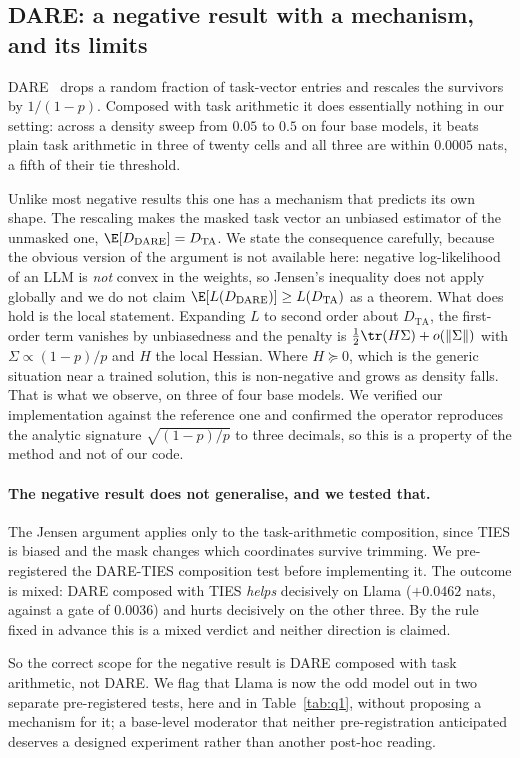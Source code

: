 \subsection{DARE: a negative result with a mechanism, and its limits}
\label{subsec:dare}

DARE~\citep{yu2024dare} drops a random fraction of task-vector entries
and rescales the survivors by $1/(1-p)$. Composed with task arithmetic it
does essentially nothing in our setting: across a density sweep from
$0.05$ to $0.5$ on four base models, it beats plain task arithmetic in
three of twenty cells and all three are within $0.0005$ nats, a fifth of
their tie threshold.

Unlike most negative results this one has a mechanism that predicts its
own shape. The rescaling makes the masked task vector an unbiased
estimator of the unmasked one, $\E[D_{\mathrm{DARE}}] = D_{\mathrm{TA}}$.
We state the consequence carefully, because the obvious version of the
argument is not available here: negative log-likelihood of an LLM is
\emph{not} convex in the weights, so Jensen's inequality does not apply
globally and we do not claim
$\E[L(D_{\mathrm{DARE}})] \geq L(D_{\mathrm{TA}})$ as a theorem. What
does hold is the local statement. Expanding $L$ to second order about
$D_{\mathrm{TA}}$, the first-order term vanishes by unbiasedness and the
penalty is $\tfrac12\tr(H\Sigma) + o(\|\Sigma\|)$ with
$\Sigma \propto (1-p)/p$ and $H$ the local Hessian. Where $H \succeq 0$,
which is the generic situation near a trained solution, this is
non-negative and grows as density falls. That is what we observe,
on three of four base models. We verified our implementation against the
reference one and confirmed the operator reproduces the analytic signature
$\sqrt{(1-p)/p}$ to three decimals, so this is a property of the method
and not of our code.

\paragraph{The negative result does not generalise, and we tested that.}
The Jensen argument applies only to the task-arithmetic composition, since
TIES is biased and the mask changes which coordinates survive trimming. We
pre-registered the DARE-TIES composition test before implementing it. The
outcome is mixed: DARE composed with TIES \emph{helps}
decisively on Llama ($+0.0462$ nats, against a gate of $0.0036$) and hurts
decisively on the other three. By the rule fixed in advance this is a
mixed verdict and neither direction is claimed.

So the correct scope for the negative result is DARE composed with task
arithmetic, not DARE. We flag that Llama is now the odd model out in two
separate pre-registered tests, here and in Table~\ref{tab:q1}, without
proposing a mechanism for it; a base-level moderator that neither
pre-registration anticipated deserves a designed experiment rather than
another post-hoc reading.
